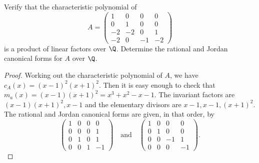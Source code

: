 \documentclass[10pt]{amsart}
\begin{document}
\begin{thm}
  \label{Ex5}
  Verify that the characteristic polynomial of 
  $$
  A = \begin{pmatrix}
    1 & 0 & 0 & 0\\
    0 & 1 & 0 & 0\\
    -2 & -2 & 0 & 1\\
    -2 & 0 & -1 & -2
  \end{pmatrix}
  $$
  is a product of linear factors over $\Q$.  Determine the rational and Jordan canonical forms for $A$ over $\Q$.
  \begin{proof}
    Working out the characteristic polynomial of $A$, we have $c_A(x) = (x-1)^2(x+1)^2$.
    Then it is easy enough to check that $m_a(x) = (x-1)(x+1)^2 = x^3 + x^2 - x - 1$.
    The invariant factors are $(x-1)(x+1)^2, x-1$ and the elementary divisors are $x-1, x-1, (x+1)^2$.
    The rational and Jordan canonical forms are given, in that order, by
    $$
    \begin{pmatrix}
      1 & 0 & 0 & 0\\
      0 & 0 & 0 & 1\\
      0 & 1 & 0 & 1\\
      0 & 0 & 1 & -1
    \end{pmatrix}
    \quad \text{and} \quad
    \begin{pmatrix}
      1 & 0 & 0 & 0\\
      0 & 1 & 0 & 0\\
      0 & 0 & -1 & 1\\
      0 & 0 & 0 & -1
    \end{pmatrix}.
    $$
  \end{proof}
\end{thm}
\end{document}
